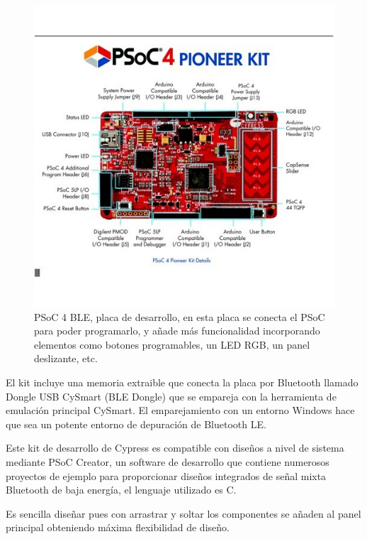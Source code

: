 \begin{figure}[h]%
	\centering
    \includegraphics[width=\linewidth]{figures/cypress_placa_desarrollo} %

    \caption[PSoC 4 BLE, placa de desarrollo]{PSoC 4 BLE, placa de desarrollo, en esta placa se conecta el PSoC para poder programarlo, y añade más funcionalidad incorporando elementos como botones programables, un LED RGB, un panel deslizante, etc.}

   \label{figuraCypressGrande}
\end{figure}

El kit incluye una memoria extraible que conecta la placa por Bluetooth llamado Dongle USB CySmart (BLE Dongle) que se empareja con la herramienta de emulación principal CySmart. El emparejamiento con un entorno Windows hace que sea un potente entorno de depuración de Bluetooth LE.

Este kit de desarrollo de Cypress es compatible con diseños a nivel de sistema mediante PSoC Creator, un software de desarrollo que contiene numerosos proyectos de ejemplo para proporcionar diseños integrados de señal mixta Bluetooth de baja energía, el lenguaje utilizado es C.

Es sencilla diseñar pues con arrastrar y soltar los componentes se añaden al panel principal obteniendo máxima flexibilidad de diseño.

